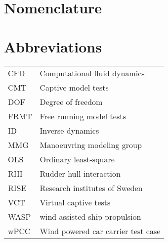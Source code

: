 \documentclass[preprint,9pt,authoryear]{elsarticle}
\begin{document}
\section*{Nomenclature}
\label{sec:introduction}
\begin{table}[h]
    \centering
    \scriptsize
    \label{tab:other_parameters}
\end{table}
\FloatBarrier

\section*{Abbreviations}
\label{sec:introduction}
\begin{table}[h]
    \centering
    \scriptsize
    \label{tab:abbreviations}
    \begin{tabular}{l l}

    CFD & Computational fluid dynamics \\
    CMT & Captive model tests \\
    DOF & Degree of freedom \\
    FRMT & Free running model tests \\
    ID & Inverse dynamics \\
    MMG & Manoeuvring modeling group \\
    OLS & Ordinary least-square \\
    RHI & Rudder hull interaction \\
    RISE & Research institutes of Sweden \\
    VCT & Virtual captive tests \\
    WASP & wind-assisted ship propulsion \\
    wPCC & Wind powered car carrier test case\\
    \end{tabular}
        
\end{table}
\FloatBarrier
\end{document}
